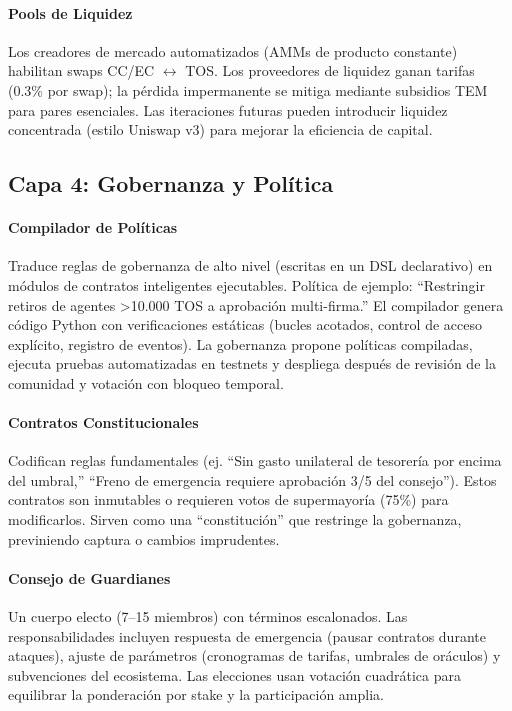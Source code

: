 \documentclass[11pt]{article}
\begin{document}
\paragraph{Pools de Liquidez} Los creadores de mercado automatizados (AMMs de producto constante) habilitan swaps CC/EC $\leftrightarrow$ TOS. Los proveedores de liquidez ganan tarifas (0.3\% por swap); la pérdida impermanente se mitiga mediante subsidios TEM para pares esenciales. Las iteraciones futuras pueden introducir liquidez concentrada (estilo Uniswap v3) para mejorar la eficiencia de capital.

\subsection{Capa 4: Gobernanza y Política}
\paragraph{Compilador de Políticas} Traduce reglas de gobernanza de alto nivel (escritas en un DSL declarativo) en módulos de contratos inteligentes ejecutables. Política de ejemplo: ``Restringir retiros de agentes >10.000 TOS a aprobación multi-firma.'' El compilador genera código Python con verificaciones estáticas (bucles acotados, control de acceso explícito, registro de eventos). La gobernanza propone políticas compiladas, ejecuta pruebas automatizadas en testnets y despliega después de revisión de la comunidad y votación con bloqueo temporal.

\paragraph{Contratos Constitucionales} Codifican reglas fundamentales (ej. ``Sin gasto unilateral de tesorería por encima del umbral,'' ``Freno de emergencia requiere aprobación 3/5 del consejo''). Estos contratos son inmutables o requieren votos de supermayoría (75\%) para modificarlos. Sirven como una ``constitución'' que restringe la gobernanza, previniendo captura o cambios imprudentes.

\paragraph{Consejo de Guardianes} Un cuerpo electo (7--15 miembros) con términos escalonados. Las responsabilidades incluyen respuesta de emergencia (pausar contratos durante ataques), ajuste de parámetros (cronogramas de tarifas, umbrales de oráculos) y subvenciones del ecosistema. Las elecciones usan votación cuadrática para equilibrar la ponderación por stake y la participación amplia.
\end{document}
